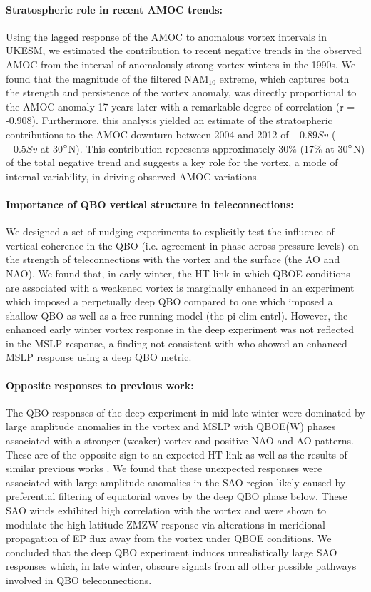 \paragraph{Stratospheric role in recent AMOC trends:}
Using the lagged response of the AMOC to anomalous vortex intervals in UKESM, we estimated the contribution to recent negative trends in the observed AMOC from the interval of anomalously strong vortex winters in the 1990s. We found that the magnitude of the filtered NAM$_{10}$ extreme, which captures both the strength and persistence of the vortex anomaly, was directly proportional to the AMOC anomaly 17 years later with a remarkable degree of correlation (r = -0.908). Furthermore, this analysis yielded an estimate of the stratospheric contributions to the AMOC downturn between 2004 and 2012 of $-0.89Sv$ ($-0.5Sv$ at 30$\degree$N). This contribution represents approximately 30\% (17\% at 30$\degree$N) of the total negative trend and suggests a key role for the vortex, a mode of internal variability, in driving observed AMOC variations. 

\paragraph{Importance of QBO vertical structure in teleconnections:}
We designed a set of nudging experiments to explicitly test the influence of vertical coherence in the QBO (i.e. agreement in phase across pressure levels) on the strength of teleconnections with the vortex and the surface (the AO and NAO). We found that, in early winter, the HT link in which QBOE conditions are associated with a weakened vortex \citep{HoltonJamesRTan1980} is marginally enhanced in an experiment which imposed a perpetually deep QBO compared to one which imposed a shallow QBO as well as a free running model (the pi-clim cntrl). However, the enhanced early winter vortex response in the deep experiment was not reflected in the MSLP response, a finding not consistent with \cite{andrewsObserved2019d} who showed an enhanced MSLP response using a deep QBO metric. 

\paragraph{Opposite responses to previous work:}
The QBO responses of the deep experiment in mid-late winter were dominated by large amplitude anomalies in the vortex and MSLP with QBOE(W) phases associated with a stronger (weaker) vortex and positive NAO and AO patterns. These are of the opposite sign to an expected HT link as well as the results of similar previous works \citep{graySurface2018b, andrewsObserved2019d}. We found that these unexpected responses were associated with large amplitude anomalies in the SAO region likely caused by preferential filtering of equatorial waves by the deep QBO phase below. These SAO winds exhibited high correlation with the vortex and were shown to modulate the high latitude ZMZW response via alterations in meridional propagation of EP flux away from the vortex under QBOE conditions. We concluded that the deep QBO experiment induces unrealistically large SAO responses which, in late winter, obscure signals from all other possible pathways involved in QBO teleconnections. 


